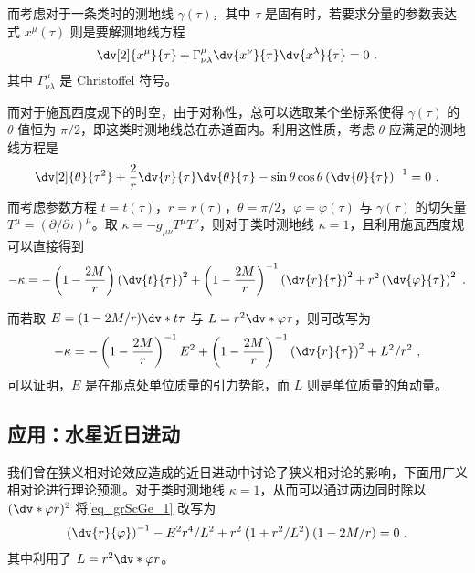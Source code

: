 而考虑对于一条类时的测地线 $\gamma(\tau)$，其中 $\tau$ 是固有时，若要求分量的参数表达式 $x^\mu(\tau)$ 则是要解测地线方程
\begin{equation}
\dv[2]{x^\mu}{\tau} + \Gamma^{\mu}_{\nu \lambda} \dv{x^\nu}{\tau} \dv{x^\lambda}{\tau} = 0~.
\end{equation}
其中 $\Gamma^\mu_{\nu \lambda}$ 是 Christoffel 符号。

而对于施瓦西度规下的时空，由于对称性，总可以选取某个坐标系使得 $\gamma(\tau)$ 的 $\theta$ 值恒为 $\pi/2$，即这类时测地线总在赤道面内。利用这性质，考虑 $\theta$ 应满足的测地线方程是
\begin{equation}
\dv[2]{\theta}{\tau^2} + \frac{2}{r} \dv{r}{\tau} \dv{\theta}{\tau} - \sin \theta \cos \theta \left(\dv{\theta}{\tau}\right)^{-1} = 0 ~.
\end{equation}
而考虑参数方程 $t = t(\tau)$，$r = r(\tau)$，$\theta = \pi/2$，$\varphi = \varphi(\tau)$ 与 $\gamma(\tau)$ 的切矢量 $T^\mu = (\partial/\partial \tau)^\mu$。取 $\kappa = -g_{\mu\nu} T^\mu T^\nu$，则对于类时测地线 $\kappa = 1$，且利用施瓦西度规可以直接得到
\begin{equation}
-\kappa = -\left(1 - \frac{2M}{r}\right)\left(\dv{t}{\tau}\right)^2 + \left(1-\frac{2M}{r}\right)^{-1} \left(\dv{r}{\tau}\right)^2 + r^2 \left(\dv{\varphi}{\tau}\right)^2 ~.
\end{equation}

而若取 $E = (1-2M/r) \dv*{t}{\tau}$ 与 $L = r^2 \dv*{\varphi}{\tau}$，则可改写为
\begin{equation}\label{eq_grScGe_1}
-\kappa = -\left(1-\frac{2M}{r}\right)^{-1} E^2  + \left(1-\frac{2M}{r}\right)^{-1} \left(\dv{r}{\tau}\right)^2 + L^2/r^2 ~,
\end{equation}
可以证明，$E$ 是在那点处单位质量的引力势能，而 $L$ 则是单位质量的角动量。

\subsection{应用：水星近日进动}\label{sub_grScGe_1}
我们曾在狭义相对论效应造成的近日进动中讨论了狭义相对论的影响，下面用广义相对论进行理论预测。对于类时测地线 $\kappa = 1$，从而可以通过两边同时除以 $(\dv*{\varphi}{r})^2$ 将\autoref{eq_grScGe_1} 改写为
\begin{equation}
\left( \dv{r}{\varphi} \right)^{-1} - E^2r^4/L^2 + r^2 \left( 1+r^2/L^2 \right)\left(1 - 2M/r\right) = 0 ~.
\end{equation}
其中利用了 $L = r^2 \dv*{\varphi}{r}$。

